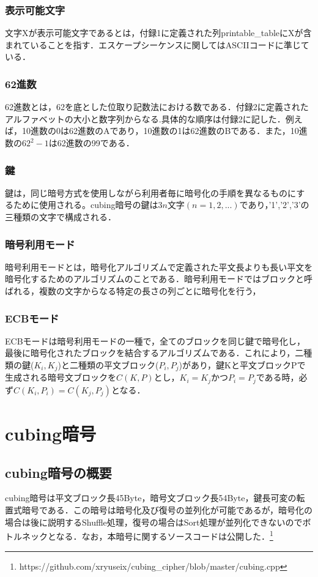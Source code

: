 \documentclass[titlepage]{jarticle}
\begin{document}
\subsubsection{表示可能文字}
文字Xが表示可能文字であるとは，付録1に定義された列printable\_tableにXが含まれていることを指す．エスケープシーケンスに関してはASCIIコードに準じている．

\subsubsection{62進数}
62進数とは，62を底とした位取り記数法における数である．付録2に定義されたアルファベットの大小と数字列からなる.具体的な順序は付録2に記した．例えば，10進数の0は62進数のAであり，10進数の1は62進数のBである．また，10進数の\(62^2-1\)は62進数の99である．

\subsubsection{鍵}
鍵は，同じ暗号方式を使用しながら利用者毎に暗号化の手順を異なるものにするために使用される。cubing暗号の鍵は\(3n\)文字\((n=1,2,...)\)であり，'1','2','3'の三種類の文字で構成される．

\subsubsection{暗号利用モード}
暗号利用モードとは，暗号化アルゴリズムで定義された平文長よりも長い平文を暗号化するためのアルゴリズムのことである．暗号利用モードではブロックと呼ばれる，複数の文字からなる特定の長さの列ごとに暗号化を行う，

\subsubsection{ECBモード}
ECBモードは暗号利用モードの一種で，全てのブロックを同じ鍵で暗号化し，最後に暗号化されたブロックを結合するアルゴリズムである．これにより，二種類の鍵(\(K_i,K_j\))と二種類の平文ブロック(\(P_i,P_j\))があり，鍵Kと平文ブロックPで生成される暗号文ブロックを\(C(K,P)\)とし，\(K_i=K_j\)かつ\(P_i=P_j\)である時，必ず\(C(K_i,P_i)=C(K_j,P_j)\)となる．

\section{cubing暗号}
\subsection{cubing暗号の概要}
cubing暗号は平文ブロック長45Byte，暗号文ブロック長54Byte，鍵長可変の転置式暗号である．この暗号は暗号化及び復号の並列化が可能であるが，暗号化の場合は後に説明するShuffle処理，復号の場合はSort処理が並列化できないのでボトルネックとなる．なお，本暗号に関するソースコードは公開した．\footnote{https://github.com/xryuseix/cubing\_cipher/blob/master/cubing.cpp}
\end{document}
